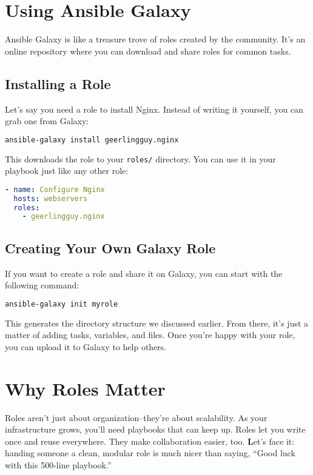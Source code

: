 \section{Using Ansible Galaxy}

Ansible Galaxy is like a treasure trove of roles created by the community. It's an online repository where you can download and share roles for common tasks.

\subsection{Installing a Role}

Let's say you need a role to install Nginx. Instead of writing it yourself, you can grab one from Galaxy:
\begin{lstlisting}[language=bash, caption=Installing a Role from Ansible Galaxy]
ansible-galaxy install geerlingguy.nginx
\end{lstlisting}

This downloads the role to your \texttt{roles/} directory. You can use it in your playbook just like any other role:
\begin{lstlisting}[language=yaml, caption=Using a Galaxy Role]
- name: Configure Nginx
  hosts: webservers
  roles:
    - geerlingguy.nginx
\end{lstlisting}

\subsection{Creating Your Own Galaxy Role}

If you want to create a role and share it on Galaxy, you can start with the following command:
\begin{lstlisting}[language=bash, caption=Creating a New Role]
ansible-galaxy init myrole
\end{lstlisting}

This generates the directory structure we discussed earlier. From there, it's just a matter of adding tasks, variables, and files. Once you're happy with your role, you can upload it to Galaxy to help others.

\section{Why Roles Matter}

Roles aren't just about organization--they're about scalability. As your infrastructure grows, you'll need playbooks that can keep up. Roles let you write once and reuse everywhere. They make collaboration easier, too. \textbf{L}et's face it: handing someone a clean, modular role is much nicer than saying, “Good luck with this 500-line playbook.”

